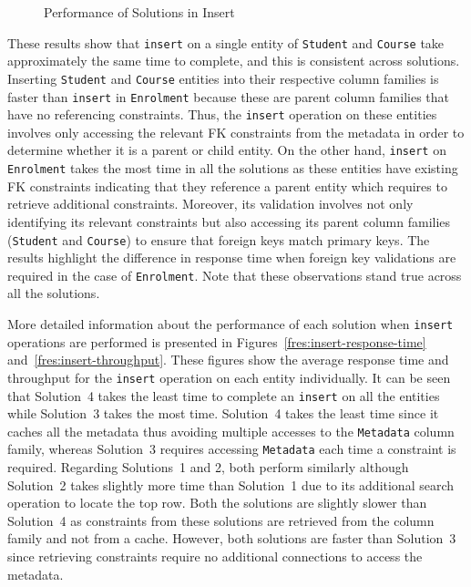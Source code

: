 \begin{figure}[H]
		\caption{Performance of Solutions in Insert}\label{fres:Insert}
	\end{figure}
	
These results show that \texttt{insert} on a single entity of \texttt{Student}
and \texttt{Course} take approximately the same time to complete, and this is
consistent across solutions.  Inserting \texttt{Student} and \texttt{Course}
entities into their respective column families is faster than \texttt{insert} in
\texttt{Enrolment} because these are parent column families that have no
referencing constraints. Thus, the \texttt{insert} operation on these entities
involves only accessing the relevant \ac{FK} constraints from the metadata in
order to determine whether it is a parent or child entity.
On the other hand,  \texttt{insert} on  \texttt{Enrolment}  takes the most time
in all the solutions as these entities have existing \ac{FK} constraints
indicating that they reference a parent entity which requires to retrieve
additional constraints. Moreover, its validation involves not only identifying
its relevant constraints but also accessing its parent column families
(\texttt{Student} and \texttt{Course}) to ensure that foreign keys match primary
keys. The results highlight the difference in response time when
foreign key validations are required in the case of \texttt{Enrolment}.
Note that these observations stand true across all the solutions.

More detailed information about the performance of each solution when
\texttt{insert} operations are performed is presented in
Figures~\ref{fres:insert-response-time} and~\ref{fres:insert-throughput}.
These figures show the average response time and throughput for the
\texttt{insert} operation on  each entity individually.
It can be seen that Solution~4 takes the least time to complete an 
\texttt{insert} on all the entities while Solution~3 takes the most time. 
Solution~4 takes the least time since it caches all the metadata thus avoiding 
multiple accesses to the \texttt{Metadata} column family, whereas Solution~3 
requires accessing \texttt{Metadata} each time a constraint is required. 
Regarding Solutions~1 and 2,  both perform similarly although Solution~2 takes 
slightly  more time than Solution~1 due to its additional search operation to 
locate the top row. Both the solutions are slightly slower than Solution~4 as 
constraints from these solutions are retrieved from the column family and  not 
from a cache. However, both solutions are faster than Solution~3 since 
retrieving constraints require no additional connections to access the metadata.




